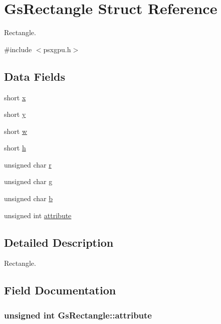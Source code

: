 \hypertarget{structGsRectangle}{}\section{Gs\+Rectangle Struct Reference}
\label{structGsRectangle}


Rectangle.  




{\ttfamily \#include $<$psxgpu.\+h$>$}

\subsection*{Data Fields}
\begin{DoxyCompactItemize}
\item 
short \hyperlink{structGsRectangle_a8a8a192806843c780965015ed683d0a8}{x}
\item 
short \hyperlink{structGsRectangle_ae4ed9d3d091f0f0db713bd14eeacb760}{y}
\item 
short \hyperlink{structGsRectangle_a00989f6d3d57549b3606a584482e361d}{w}
\item 
short \hyperlink{structGsRectangle_ac45d6fdb150593eb8eefd22743095b52}{h}
\item 
unsigned char \hyperlink{structGsRectangle_ac86a6bb678cbcb69d9985f96e688b1e1}{r}
\item 
unsigned char \hyperlink{structGsRectangle_a734cac760af5b5878c433397ed7bd138}{g}
\item 
unsigned char \hyperlink{structGsRectangle_a9d865585075c4277ecbc75df08c095cb}{b}
\item 
unsigned int \hyperlink{structGsRectangle_a8133cbcc469e34ec75ab5ba4ba73c2de}{attribute}
\end{DoxyCompactItemize}


\subsection{Detailed Description}
Rectangle. 

\subsection{Field Documentation}
\hypertarget{structGsRectangle_a8133cbcc469e34ec75ab5ba4ba73c2de}{}
\subsubsection[{attribute}]{\setlength{\rightskip}{0pt plus 5cm}unsigned int Gs\+Rectangle\+::attribute}\label{structGsRectangle_a8133cbcc469e34ec75ab5ba4ba73c2de}
\hypertarget{structGsRectangle_a9d865585075c4277ecbc75df08c095cb}{}
